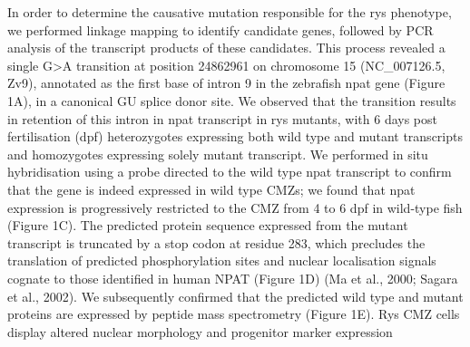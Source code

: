In order to determine the causative mutation responsible for the rys phenotype, we performed linkage mapping to identify candidate genes, followed by PCR analysis of the transcript products of these candidates. This process revealed a single G>A transition at position 24862961 on chromosome 15 (NC_007126.5, Zv9), annotated as the first base of intron 9 in the zebrafish npat gene (Figure 1A), in a canonical GU splice donor site. We observed that the transition results in retention of this intron in npat transcript in rys mutants, with 6 days post fertilisation (dpf) heterozygotes expressing both wild type and mutant transcripts and homozygotes expressing solely mutant transcript. We performed in situ hybridisation using a probe directed to the wild type npat transcript to confirm that the gene is indeed expressed in wild type CMZs; we found that npat expression is progressively restricted to the CMZ from 4 to 6 dpf in wild-type fish (Figure 1C). The predicted protein sequence expressed from the mutant transcript is truncated by a stop codon at residue 283, which precludes the translation of predicted phosphorylation sites and nuclear localisation signals cognate to those identified in human NPAT (Figure 1D) (Ma et al., 2000; Sagara et al., 2002). We subsequently confirmed that the predicted wild type and mutant proteins are expressed by peptide mass spectrometry (Figure 1E). 
Rys CMZ cells display altered nuclear morphology and progenitor marker expression
